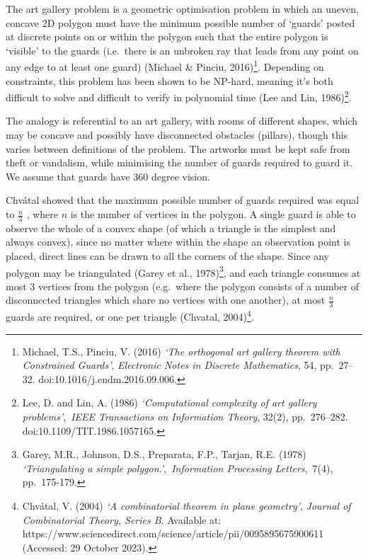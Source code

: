 \documentclass[
]{article}
\begin{document}
The art gallery problem is a geometric optimisation problem in which an
uneven, concave 2D polygon must have the minimum possible number of
`guards' posted at discrete points on or within the polygon such that
the entire polygon is `visible' to the guards (i.e.~there is an unbroken
ray that leads from any point on any edge to at least one guard)
(Michael \& Pinciu, 2016)\footnote{Michael, T.S., Pinciu, V. (2016)
  \emph{`The orthogonal art gallery theorem with Constrained Guards'},
  \emph{Electronic Notes in Discrete Mathematics}, 54, pp.~27--32.
  doi:10.1016/j.endm.2016.09.006.}. Depending on constraints, this
problem has been shown to be NP-hard, meaning it's both difficult to
solve and difficult to verify in polynomial time (Lee and Lin,
1986)\footnote{Lee, D. and Lin, A. (1986) \emph{`Computational
  complexity of art gallery problems'},~\emph{IEEE Transactions on
  Information Theory}, 32(2), pp.~276--282.
  doi:10.1109/TIT.1986.1057165.}.

The analogy is referential to an art gallery, with rooms of different
shapes, which may be concave and possibly have disconnected obstacles
(pillars), though this varies between definitions of the problem. The
artworks must be kept safe from theft or vandalism, while minimising the
number of guards required to guard it. We assume that guards have 360
degree vision.

Chvátal showed that the maximum possible number of guards required was
equal to \(\frac{n}{3}\) , where \(n\) is the number of vertices in the
polygon. A single guard is able to observe the whole of a convex shape
(of which a triangle is the simplest and always convex), since no matter
where within the shape an observation point is placed, direct lines can
be drawn to all the corners of the shape. Since any polygon may be
triangulated (Garey et al., 1978)\footnote{Garey, M.R., Johnson, D.S.,
  Preparata, F.P., Tarjan, R.E. (1978) \emph{`Triangulating a simple
  polygon.'},~\emph{Information Processing Letters},~7(4), pp.~175-179.},
and each triangle consumes at most 3 vertices from the polygon
(e.g.~where the polygon consists of a number of disconnected triangles
which share no vertices with one another), at most \(\frac{n}{3}\)
guards are required, or one per triangle (Chvatal, 2004)\footnote{Chvátal,
  V. (2004) \emph{`A combinatorial theorem in plane geometry'},
  \emph{Journal of Combinatorial Theory, Series B}. Available at:
  https://www.sciencedirect.com/science/article/pii/0095895675900611
  (Accessed: 29 October 2023).}.
\end{document}
